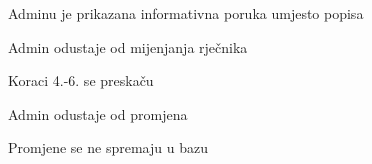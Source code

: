 \begin{packed_item}
\begin{packed_item}
\begin{packed_enum}
			\item Adminu je prikazana informativna poruka umjesto popisa
			\item Admin odustaje od mijenjanja rječnika
			\item Koraci 4.-6. se preskaču
			
		\end{packed_enum}

		\item[5.a] Admin odustaje od promjena
		\item[] \begin{packed_enum}
			
			\item Promjene se ne spremaju u bazu
			
		\end{packed_enum}
		
	\end{packed_item}

\end{packed_item}


